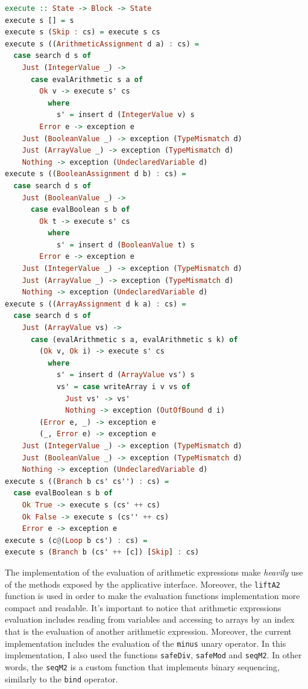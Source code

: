\documentclass[12pt,a4paper]{article}
\begin{document}
\begin{lstlisting}[language=Haskell, style=custom-style]
execute :: State -> Block -> State
execute s [] = s
execute s (Skip : cs) = execute s cs
execute s ((ArithmeticAssignment d a) : cs) =
  case search d s of
    Just (IntegerValue _) ->
      case evalArithmetic s a of
        Ok v -> execute s' cs
          where
            s' = insert d (IntegerValue v) s
        Error e -> exception e
    Just (BooleanValue _) -> exception (TypeMismatch d)
    Just (ArrayValue _) -> exception (TypeMismatch d)
    Nothing -> exception (UndeclaredVariable d)
execute s ((BooleanAssignment d b) : cs) =
  case search d s of
    Just (BooleanValue _) ->
      case evalBoolean s b of
        Ok t -> execute s' cs
          where
            s' = insert d (BooleanValue t) s
        Error e -> exception e
    Just (IntegerValue _) -> exception (TypeMismatch d)
    Just (ArrayValue _) -> exception (TypeMismatch d)
    Nothing -> exception (UndeclaredVariable d)
execute s ((ArrayAssignment d k a) : cs) =
  case search d s of
    Just (ArrayValue vs) ->
      case (evalArithmetic s a, evalArithmetic s k) of
        (Ok v, Ok i) -> execute s' cs
          where
            s' = insert d (ArrayValue vs') s
            vs' = case writeArray i v vs of
              Just vs' -> vs'
              Nothing -> exception (OutOfBound d i)
        (Error e, _) -> exception e
        (_, Error e) -> exception e
    Just (IntegerValue _) -> exception (TypeMismatch d)
    Just (BooleanValue _) -> exception (TypeMismatch d)
    Nothing -> exception (UndeclaredVariable d)
execute s ((Branch b cs' cs'') : cs) =
  case evalBoolean s b of
    Ok True -> execute s (cs' ++ cs)
    Ok False -> execute s (cs'' ++ cs)
    Error e -> exception e
execute s (c@(Loop b cs') : cs) =
execute s (Branch b (cs' ++ [c]) [Skip] : cs)
\end{lstlisting}
The implementation of the evaluation of arithmetic expressions make \textit{heavily} use of the methods exposed by the applicative interface.
Moreover, the \texttt{liftA2} function is used in order to make the evaluation functions implementation more compact and readable.
It's important to notice that arithmetic expressions evaluation includes reading from variables and accessing to arrays by an index that is the evaluation of another arithmetic expression.
Moreover, the current implementation includes the evaluation of the \texttt{minus} unary operator.
In this implementation, I also used the functions \texttt{safeDiv}, \texttt{safeMod} and \texttt{seqM2}.
In other words, the \texttt{seqM2} is a custom function that implements binary sequencing, similarly to the \texttt{bind} operator.
\end{document}
